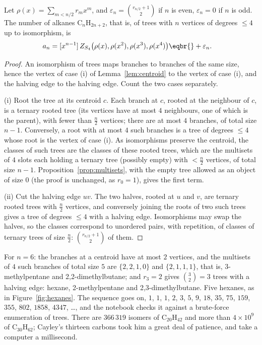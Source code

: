 \begin{theorem}\label{thm:alkanes}
Let $\rho(x)=\sum_{m<n/2}r_mx^m$, and $\varepsilon_n=\binom{r_{n/2}+1}2$ if $n$ is even, $\varepsilon_n=0$ if $n$ is odd. The number of alkanes $\mathrm C_n\mathrm H_{2n+2}$,
that is, of trees with $n$ vertices of degrees $\le4$ up to isomorphism, is
\[
\begin{aligned}{}&a_n=[x^{n-1}]\,Z_{S_4}\big(\rho(x),\rho(x^2),\rho(x^3),\rho(x^4)\big)\eqbr{}+\varepsilon_n.\end{aligned}
\]
\end{theorem}
\begin{proof}
An isomorphism of trees maps branches to branches of the same size, hence the vertex of case (i) of Lemma~\ref{lem:centroid} to the
vertex of case (i), and the halving edge to the halving edge. Count the two cases separately.

(i) Root the tree at its centroid $c$. Each branch at $c$, rooted at the neighbour of $c$, is a ternary rooted tree (its vertices have
at most $4$ neighbours, one of which is the parent), with fewer than $\frac n2$ vertices; there are at most $4$ branches, of total size $n-1$.
Conversely, a root with at most $4$ such branches is a tree of degrees $\le4$ whose root is the vertex of case (i). As isomorphisms
preserve the centroid, the classes of such trees are the classes of these rooted trees, which are the multisets of $4$ slots each
holding a ternary tree (possibly empty) with $<\frac n2$ vertices, of total size $n-1$. Proposition~\ref{prop:multisets}, with the empty tree
allowed as an object of size $0$ (the proof is unchanged, as $r_0=1$), gives the first term.

(ii) Cut the halving edge $uv$. The two halves, rooted at $u$ and $v$, are ternary rooted trees with $\frac n2$ vertices, and conversely
joining the roots of two such trees gives a tree of degrees $\le4$ with a halving edge. Isomorphisms may swap the halves, so the
classes correspond to unordered pairs, with repetition, of classes of ternary trees of size $\frac n2$: $\binom{r_{n/2}+1}2$ of them.
\end{proof}

For $n=6$: the branches at a centroid have at most $2$ vertices, and the multisets of $4$ such branches of total size $5$ are $\{2,2,1,0\}$
and $\{2,1,1,1\}$, that is, 3-methylpentane and 2,2-dimethylbutane; and $r_3=2$ gives $\binom32=3$ trees with a halving edge: hexane,
2-methylpentane and 2,3-dimethylbutane. Five hexanes, as in Figure~\ref{fig:hexanes}. The sequence goes on, $1$, $1$, $1$, $2$, $3$, $5$, $9$, $18$, $35$, $75$, $159$, $355$, $802$, $1858$, $4347$, \dots,
and the notebook checks it against a brute-force enumeration of trees. There are $366\,319$ isomers of $\mathrm C_{20}\mathrm H_{42}$ and more
than $4\times10^{9}$ of $\mathrm C_{30}\mathrm H_{62}$; Cayley's thirteen carbons took him a great deal of patience, and take a computer a millisecond.

